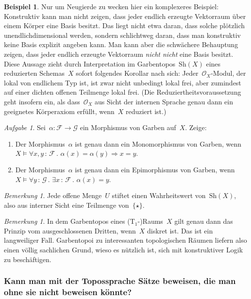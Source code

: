 \documentclass[a4paper,ngerman,12pt]{scrartcl}
\theoremstyle{definition}
\newtheorem{bsp}[defn]{Beispiel}
\theoremstyle{plain}
\theoremstyle{remark}
\newtheorem{bem}[defn]{Bemerkung}
\newtheorem{aufg}[defn]{Aufgabe}
\newcommand{\F}{\mathcal{F}}
\newcommand{\G}{\mathcal{G}}
\renewcommand{\O}{\mathcal{O}}
\newcommand{\Sh}{\mathrm{Sh}}
\renewcommand{\_}{\mathpunct{.}\,}
\newcommand{\?}{\,{:}\,}
\begin{document}
\begin{bsp}Nur um Neugierde zu wecken hier ein komplexeres Beispiel:
Konstruktiv kann man nicht zeigen, dass jeder endlich erzeugte Vektorraum über
einem Körper eine Basis besitzt. Das liegt nicht etwa daran, dass solche
plötzlich unendlichdimensional werden, sondern schlichtweg daran, dass man
konstruktiv keine Basis explizit angeben kann. Man kann aber die schwächere
Behauptung zeigen, dass jeder endlich erzeugte Vektorraum \emph{nicht nicht}
eine Basis besitzt. Diese Aussage zieht durch Interpretation im
Garbentopos~$\Sh(X)$ eines reduzierten Schemas~$X$ sofort folgendes Korollar
nach sich: Jeder~$\O_X$-Modul, der lokal von endlichem Typ ist, ist zwar nicht
unbedingt lokal frei, aber zumindest auf einer dichten offenen Teilmenge lokal
frei. (Die Reduziertheitsvoraussetzung geht insofern ein, als dass~$\O_X$ aus
Sicht der internen Sprache genau dann ein geeignetes Körperaxiom erfüllt,
wenn~$X$ reduziert ist.)\end{bsp}

\begin{aufg}Sei~$\alpha : \F \to \G$ ein Morphismus von Garben auf~$X$. Zeige:
\begin{enumerate}
\item
Der Morphismus~$\alpha$ ist genau dann ein Monomorphismus von Garben, wenn
$X \models \forall x,y\?\F\_ \alpha(x) = \alpha(y) \Rightarrow x = y$.
\item
Der Morphismus~$\alpha$ ist genau dann ein Epimorphismus von Garben, wenn
$X \models \forall y\?\G\_ \exists x\?\F\_ \alpha(x) = y$.
\end{enumerate}
\end{aufg}

\begin{bem}\label{offene-mengen-als-wahrheitswerte}Jede offene Menge~$U$
stiftet einen Wahrheitswert von~$\Sh(X)$, also aus interner Sicht eine
Teilmenge von~$\{\star\}$.
\end{bem}

\begin{bem}In dem Garbentopos eines ($\text{T}_1$-)Raums~$X$ gilt genau dann das Prinzip
vom ausgeschlossenen Dritten, wenn~$X$ diskret ist. Das ist ein langweiliger
Fall. Garbentopoi zu interessanten topologischen Räumen liefern also einen
völlig sachlichen Grund, wieso es nützlich ist, sich mit konstruktiver Logik zu
beschäftigen.
\end{bem}


\subsubsection*{Kann man mit der Topossprache Sätze beweisen, die man ohne sie
nicht beweisen könnte?}
\end{document}
